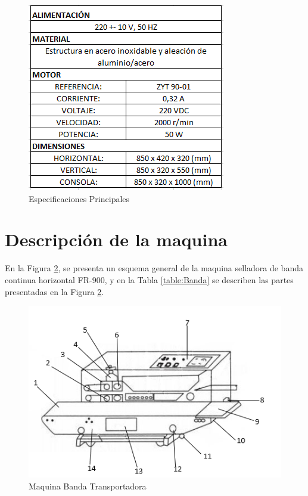 		\begin{figure}[ht]
			\centering
			\includegraphics[scale=0.75]{Figs/13.png}
			\caption{Especificaciones Principales}
			\label{fig:principales}
		\end{figure}
		
	
\newpage
	\section{Descripción de la maquina}
		En la Figura \ref{fig:Banda}, se presenta un esquema general de la maquina selladora de banda continua horizontal FR-900, y en la Tabla \ref{table:Banda} se describen las partes presentadas en la Figura \ref{fig:Banda}.
		\begin{figure}[ht]
			\centering
			\includegraphics[scale=0.95]{Figs/65.png}
			\caption{Maquina Banda Transportadora}
			\label{fig:Banda}
		\end{figure}
	
